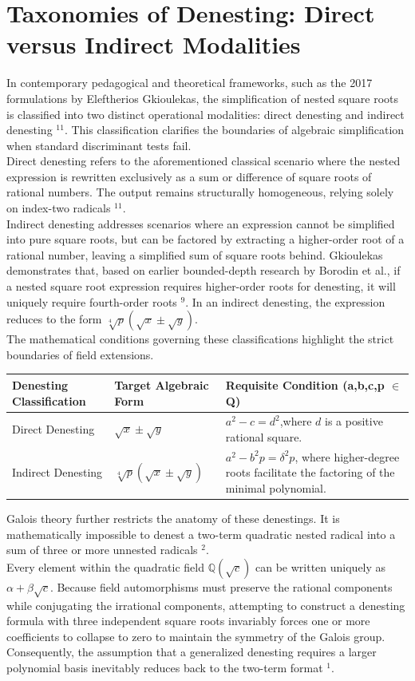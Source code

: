 \documentclass[10pt]{article}
\begin{document}
\section*{Taxonomies of Denesting: Direct versus Indirect Modalities}
In contemporary pedagogical and theoretical frameworks, such as the 2017 formulations by Eleftherios Gkioulekas, the simplification of nested square roots is classified into two distinct operational modalities: direct denesting and indirect denesting ${ }^{11}$. This classification clarifies the boundaries of algebraic simplification when standard discriminant tests fail.\\
Direct denesting refers to the aforementioned classical scenario where the nested expression is rewritten exclusively as a sum or difference of square roots of rational numbers. The output remains structurally homogeneous, relying solely on index-two radicals ${ }^{11}$.\\
Indirect denesting addresses scenarios where an expression cannot be simplified into pure square roots, but can be factored by extracting a higher-order root of a rational number, leaving a simplified sum of square roots behind. Gkioulekas demonstrates that, based on earlier bounded-depth research by Borodin et al., if a nested square root expression requires higher-order roots for denesting, it will uniquely require fourth-order roots ${ }^{9}$. In an indirect denesting, the expression reduces to the form $\sqrt[4]{p}(\sqrt{x} \pm \sqrt{y})$.\\
The mathematical conditions governing these classifications highlight the strict boundaries of field extensions.

\begin{center}
\begin{tabular}[t]{|l|l|l|}
\hline
Denesting Classification & Target Algebraic Form & Requisite Condition (a,b,c,p $\in$ Q) \\
\hline
Direct Denesting & $\sqrt{x} \pm \sqrt{y}$ & $a^{2}-c=d^{2}$,where $d$ is a positive rational square. \\
\hline
Indirect Denesting & $\sqrt[4]{p}(\sqrt{x} \pm \sqrt{y})$ & $a^{2}-b^{2} p=\delta^{2} p$, where higher-degree roots facilitate the factoring of the minimal polynomial. \\
\hline
\end{tabular}
\end{center}

Galois theory further restricts the anatomy of these denestings. It is mathematically impossible to denest a two-term quadratic nested radical into a sum of three or more unnested radicals ${ }^{2}$.\\
Every element within the quadratic field $\mathbb{Q}(\sqrt{c})$ can be written uniquely as $\alpha+\beta \sqrt{c}$. Because field automorphisms must preserve the rational components while conjugating the irrational components, attempting to construct a denesting formula with three independent square roots invariably forces one or more coefficients to collapse to zero to maintain the symmetry of the Galois group. Consequently, the assumption that a generalized denesting requires a larger polynomial basis inevitably reduces back to the two-term format ${ }^{1}$.
\end{document}
